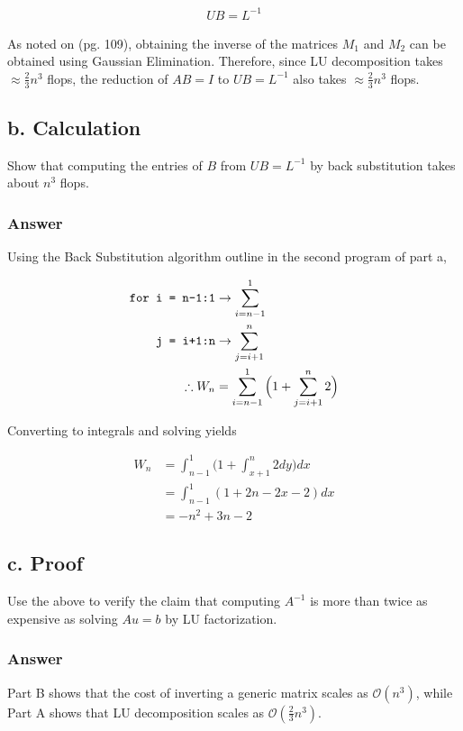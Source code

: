 \documentclass{article}
\def\code#1{\texttt{#1}}
\begin{document}
		\begin{align*}
			UB=L^{-1}
		\end{align*}
		
		As noted on \cite{BG}(pg. 109), obtaining the inverse of the matrices $M_{1}$ and $M_{2}$ can be obtained using Gaussian Elimination.  Therefore, since LU decomposition takes $\approx\frac{2}{3}n^3$ flops, the reduction of $AB=I$ to $UB=L^{-1}$ also takes $\approx\frac{2}{3}n^3$ flops.
		\subsection{b. Calculation}
		Show that computing the entries of $B$ from $UB=L^{-1}$ by back substitution takes about $n^{3}$ flops.
	
		\subsubsection{Answer}
		
		Using the Back Substitution algorithm outline in the second program of part a,
		
		\begin{align*}
		\text{\code{for i = n-1:1}}&\rightarrow\sum_{i=n-1}^{1}\\
		\text{\code{j = i+1:n}}&\rightarrow\sum_{j=i+1}^{n}\\
		\therefore W_{n}&=\sum_{i=n-1}^{1}\Big(1+\sum_{j=i+1}^{n}2\Big)
		\end{align*}
		
		Converting to integrals and solving yields
		
		\begin{align*}
			W_{n}&=\int_{n-1}^{1}\Big(1+\int_{x+1}^{n}2dy)dx\\
			&=\int_{n-1}^{1}(1+2n-2x-2)dx\\
			&=-n^2+3n-2
		\end{align*}
		
		
		
		\subsection{c. Proof}
		Use the above to verify the claim that computing $A^{-1}$ is more than twice as expensive as solving $Au=b$ by LU factorization.
	
		\subsubsection{Answer}
		Part B shows that the cost of inverting a generic matrix scales as $\mathcal{O}(n^3)$, while Part A shows that LU decomposition scales as $\mathcal{O}(\frac{2}{3}n^3)$.  
		
\end{document}
